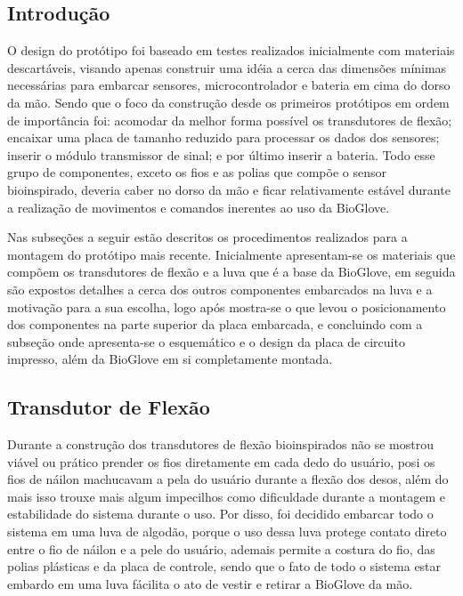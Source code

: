\documentclass[
	12pt,				%
	openright,			%
	oneside,			%
	a4paper,			%
	english,			%
	brazil				%
	]{abntex2}
\begin{document}
		
				\subsection{Introdução}	
				

		O design do protótipo foi baseado em testes realizados inicialmente com materiais descartáveis, visando apenas construir uma idéia a cerca das dimensões mínimas necessárias para embarcar sensores, microcontrolador e bateria em cima do dorso da mão. Sendo que o foco da construção desde os primeiros protótipos em ordem de importância foi: acomodar da melhor forma possível os transdutores de flexão; encaixar uma placa de tamanho reduzido para processar os dados dos sensores; inserir o módulo transmissor de sinal; e por último inserir a bateria. Todo esse grupo de componentes, exceto os fios e as polias que compõe o sensor bioinspirado, deveria caber no dorso da mão e ficar relativamente estável durante a realização de movimentos e comandos inerentes ao uso da BioGlove.

		Nas subseções a seguir estão descritos os procedimentos realizados para a montagem do protótipo mais recente. Inicialmente apresentam-se os materiais que compõem os transdutores de flexão e a luva que é a base da BioGlove, em seguida são expostos detalhes a cerca dos outros componentes embarcados na luva e a motivação para a sua escolha, logo após mostra-se o que levou o posicionamento dos componentes na parte superior da placa embarcada, e concluindo com a subseção onde apresenta-se o esquemático e o design da placa de circuito impresso, além da BioGlove em si completamente montada.

		\subsection{Transdutor de Flexão}

		Durante a construção dos transdutores de flexão bioinspirados não se mostrou viável ou prático prender os fios diretamente em cada dedo do usuário, posi os fios de náilon machucavam a pela do usuário durante a flexão dos desos, além do mais isso trouxe mais algum impecilhos como dificuldade durante a montagem e estabilidade do sistema durante o uso. Por disso, foi decidido embarcar todo o sistema em uma luva de algodão, porque o uso dessa luva protege contato direto entre o fio de náilon e a pele do usuário, ademais permite a costura do fio, das polias plásticas e da placa de controle, sendo que o fato de todo o sistema estar embardo em uma luva fácilita o ato de vestir e retirar a BioGlove da mão.
		
\end{document}
